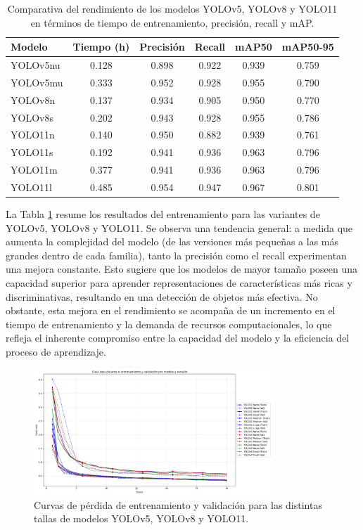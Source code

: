 \documentclass[11pt,spanish,listoffigures,listoftables]{tfgetsinf}
\begin{document}
\begin{table}[H]
   \centering
   \begin{tabular}{l | c | c | c | c | c}
      \toprule
      Modelo & Tiempo (h) & Precisión & Recall & mAP50 & mAP50-95 \\
      \midrule
      YOLOv5nu & 0.128 & 0.898 & 0.922 & 0.939 & 0.759 \\
      YOLOv5mu & 0.333 & 0.952 &  0.928 & 0.955 & 0.790 \\
      YOLOv8n & 0.137 & 0.934 & 0.905 & 0.950 & 0.770 \\
      YOLOv8s & 0.202 & 0.943 & 0.928 & 0.955 & 0.786 \\
      YOLO11n & 0.140 & 0.950 & 0.882 & 0.939 & 0.761 \\
      YOLO11s & 0.192 & 0.941 & 0.936 & 0.963 & 0.796 \\
      YOLO11m & 0.377 & 0.941 & 0.936 & 0.963 & 0.796 \\
      YOLO11l & 0.485 & 0.954 & 0.947 & 0.967 & 0.801 \\
      \bottomrule
   \end{tabular}
   \caption{Comparativa del rendimiento de los modelos YOLOv5, YOLOv8 y YOLO11 en términos de tiempo de entrenamiento, precisión, recall y mAP.}
   \label{tab:modelos_metrics}
\end{table}

La Tabla \ref{tab:modelos_metrics} resume los resultados del entrenamiento para las variantes de YOLOv5, YOLOv8 y YOLO11. Se observa una tendencia general: a medida que aumenta la complejidad del modelo (de las versiones más pequeñas a las más grandes dentro de cada familia), tanto la precisión como el recall experimentan una mejora constante. Esto sugiere que los modelos de mayor tamaño poseen una capacidad superior para aprender representaciones de características más ricas y discriminativas, resultando en una detección de objetos más efectiva. No obstante, esta mejora en el rendimiento se acompaña de un incremento en el tiempo de entrenamiento y la demanda de recursos computacionales, lo que refleja el inherente compromiso entre la capacidad del modelo y la eficiencia del proceso de aprendizaje.

\begin{figure}[H]
   \centering
   \includegraphics[width=0.8\textwidth]{excels/entrenamiento/loss_plot.png}
   \caption{Curvas de pérdida de entrenamiento y validación para las distintas tallas de modelos YOLOv5, YOLOv8 y YOLO11.}
   \label{fig:loss_curves}
\end{figure}
\end{document}
